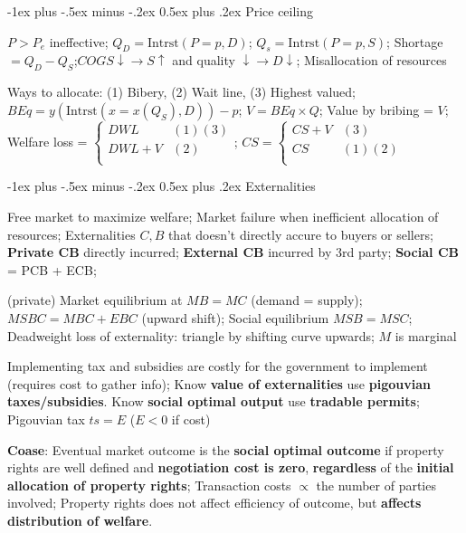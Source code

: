 \documentclass[a4paper]{article}
\makeatletter
\renewcommand{\section}{\@startsection{section}{1}{0mm}%
                                {-1ex plus -.5ex minus -.2ex}%
                                {0.5ex plus .2ex}%
                                {\normalfont\small\bfseries}}
\makeatother
\begin{document}
\begin{multicols*}{3}
        \section{Price ceiling}

    $P > P_e$ ineffective; $Q_D=\text{Intrst}(P=p,D)$; $Q_s=\text{Intrst}(P=p,S)$; Shortage $= Q_D-Q_S$;$COGS \downarrow \to S \uparrow$ and quality $\downarrow \to D \downarrow$; Misallocation of resources

        Ways to allocate: (1) Bibery, (2) Wait line, (3) Highest valued; $BEq = y(\text{Intrst}(x=x(Q_S), D))-p$; $V=BEq\times Q$; Value by bribing = $V$; Welfare loss = $\begin{cases}
        DWL     & (1)(3) \\
        DWL + V & (2)    \\
    \end{cases}$; $CS = \begin{cases}
        CS + V & (3)    \\
        CS     & (1)(2) \\
    \end{cases}$

        \section{Externalities}

        Free market to maximize welfare; Market failure when inefficient allocation of resources; Externalities $C,B$ that doesn't directly accure to buyers or sellers; \textbf{Private CB} directly incurred; \textbf{External CB} incurred by 3rd party; \textbf{Social CB} = PCB + ECB;

        (private) Market equilibrium at $MB=MC$ (demand = supply); $MSBC = MBC + EBC$ (upward shift); Social equilibrium $MSB = MSC$; Deadweight loss of externality: triangle by shifting curve upwards; $M$ is marginal

        Implementing tax and subsidies are costly for the government to implement (requires cost to gather info); Know \textbf{value of externalities} use \textbf{pigouvian taxes/subsidies}. Know \textbf{social optimal output} use \textbf{tradable permits}; Pigouvian tax $ts = E$ ($E<0$ if cost)

        \textbf{Coase}: Eventual market outcome is the \textbf{social optimal outcome} if property rights are well defined and \textbf{negotiation cost is zero}, \textbf{regardless} of the \textbf{initial allocation of property rights}; Transaction costs $\propto$ the number of parties involved; Property rights does not affect efficiency of outcome, but \textbf{affects distribution of welfare}.


\end{multicols*}
\end{document}
